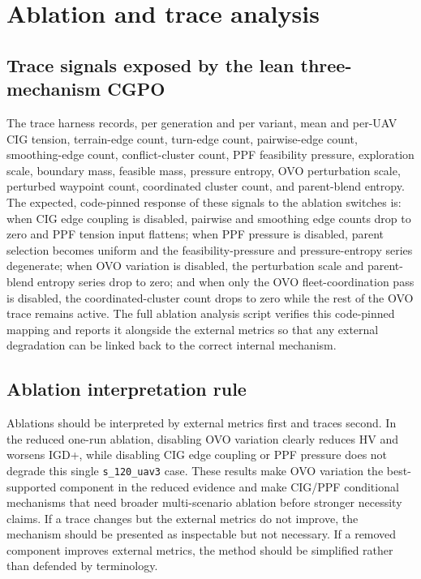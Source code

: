 \documentclass[a4paper,fleqn]{cas-dc}
\begin{document}
\section{Ablation and trace analysis}
\label{sec:ablation}

\subsection{Trace signals exposed by the lean three-mechanism CGPO}

The trace harness records, per generation and per variant, mean and per-UAV CIG tension, terrain-edge count, turn-edge count, pairwise-edge count, smoothing-edge count, conflict-cluster count, PPF feasibility pressure, exploration scale, boundary mass, feasible mass, pressure entropy, OVO perturbation scale, perturbed waypoint count, coordinated cluster count, and parent-blend entropy. The expected, code-pinned response of these signals to the ablation switches is: when CIG edge coupling is disabled, pairwise and smoothing edge counts drop to zero and PPF tension input flattens; when PPF pressure is disabled, parent selection becomes uniform and the feasibility-pressure and pressure-entropy series degenerate; when OVO variation is disabled, the perturbation scale and parent-blend entropy series drop to zero; and when only the OVO fleet-coordination pass is disabled, the coordinated-cluster count drops to zero while the rest of the OVO trace remains active. The full ablation analysis script verifies this code-pinned mapping and reports it alongside the external metrics so that any external degradation can be linked back to the correct internal mechanism.

\subsection{Ablation interpretation rule}

Ablations should be interpreted by external metrics first and traces second. In the reduced one-run ablation, disabling OVO variation clearly reduces HV and worsens IGD+, while disabling CIG edge coupling or PPF pressure does not degrade this single \texttt{s\_120\_uav3} case. These results make OVO variation the best-supported component in the reduced evidence and make CIG/PPF conditional mechanisms that need broader multi-scenario ablation before stronger necessity claims. If a trace changes but the external metrics do not improve, the mechanism should be presented as inspectable but not necessary. If a removed component improves external metrics, the method should be simplified rather than defended by terminology.
\end{document}
